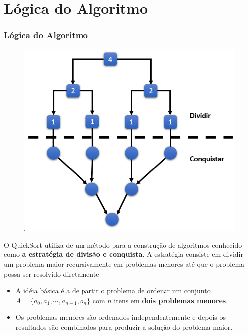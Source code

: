 \documentclass[
	11pt, %
]{beamer}
\begin{document}
\section{Lógica do Algoritmo}
\begin{frame}
	\frametitle{Lógica do Algoritmo}
	
	{\scriptsize
	\begin{figure}
		\includegraphics[width=1\linewidth]{dividir_conquistar}
	\end{figure}

	\justifying O QuickSort utiliza de um método para a construção de algoritmos conhecido como \textbf{a estratégia de divisão e conquista}. A estratégia consiste em dividir um problema maior recursivamente em problemas menores até que o problema possa ser resolvido diretamente
	
	\bigskip
	
	\begin{itemize}		
		\item \justifying A idéia básica é a de partir o problema de ordenar um conjunto $A = \{a_0, a_1, \cdots, a_{n-1}, a_{n} \}$ com $n$ itens em \textbf{dois problemas menores}.
		
		\bigskip
		
		\item \justifying Os problemas menores são ordenados independentemente e depois os resultados são combinados para produzir a solução do problema maior.
	\end{itemize}
	}
\end{frame}
\end{document}
